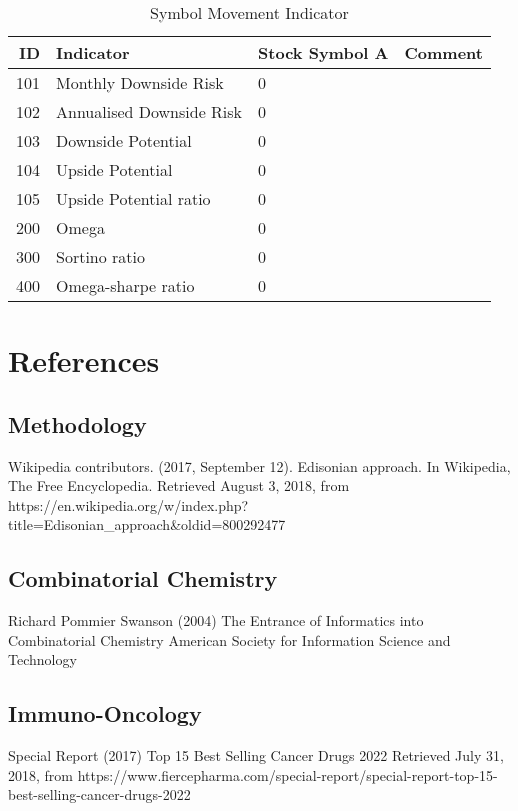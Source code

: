 \begin{table}[ht]
	\caption{Symbol Movement Indicator \cite{key100}}
	\begin{tabular}{rlll}
		\hline
		ID & Indicator & Stock Symbol A & Comment \\
		\hline
		101 & Monthly Downside Risk & 0 & \\ 
		102 & Annualised Downside Risk & 0 & \\ 
		103 & Downside Potential & 0 & \\ 
		104 & Upside Potential & 0 & \\ 
		105 & Upside Potential ratio & 0 & \\ 
		200 & Omega & 0 &  \\ 
		300 & Sortino ratio & 0 & \\ 
		400 & Omega-sharpe ratio & 0 & \\ 
		\hline
	\end{tabular}
\end{table}


\section{References}

\subsection{Methodology}

Wikipedia contributors. (2017, September 12). 
\newblock Edisonian approach. 
\newblock In Wikipedia, The Free Encyclopedia. Retrieved August 3, 2018, from  https://en.wikipedia.org/w/index.php?title=Edisonian_approach&oldid=800292477

\subsection{Combinatorial Chemistry}

Richard Pommier Swanson (2004)
\newblock The Entrance of Informatics into Combinatorial Chemistry
\newblock American Society for Information Science and Technology


\subsection{Immuno-Oncology}

Special Report (2017)
\newblock Top 15 Best Selling Cancer Drugs 2022
\newblock Retrieved July 31, 2018, from https://www.fiercepharma.com/special-report/special-report-top-15-best-selling-cancer-drugs-2022

